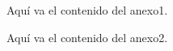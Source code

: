 \label{anexo:ejemplo1}
Aquí va el contenido del anexo1.

\label{anexo:ejemplo2}
Aquí va el contenido del anexo2.

